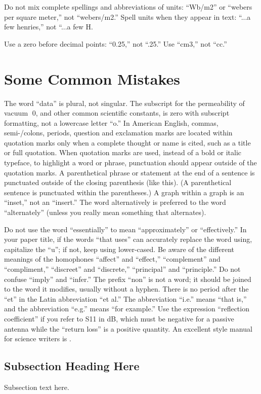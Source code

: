 \documentclass[conference,a4paper]{IEEEtran}
\begin{document}
Do not mix complete spellings and abbreviations of units: “Wb/m2” or “webers per square meter,” not “webers/m2.” Spell units when they appear in text: “...a few henries,” not “...a few H.

Use a zero before decimal points: “0.25,” not “.25.” Use “cm3,” not “cc.”


\vspace{7pt}
\section{Some Common Mistakes}
The word “data” is plural, not singular.
The subscript for the permeability of vacuum 0, and other common scientific constants, is zero with subscript formatting, not a lowercase letter “o.”
In American English, commas, semi-/colons, periods, question and exclamation marks are located within quotation marks only when a complete thought or name is cited, such as a title or full quotation. When quotation marks are used, instead of a bold or italic typeface, to highlight a word or phrase, punctuation should appear outside of the quotation marks. A parenthetical phrase or statement at the end of a sentence is punctuated outside of the closing parenthesis (like this). (A parenthetical sentence is punctuated within the parentheses.)
A graph within a graph is an “inset,” not an “insert.” The word alternatively is preferred to the word “alternately” (unless you really mean something that alternates).

Do not use the word “essentially” to mean “approximately” or “effectively.”
In your paper title, if the words “that uses” can accurately replace the word using, capitalize the “u”; if not, keep using lower-cased.
Be aware of the different meanings of the homophones “affect” and “effect,” “complement” and “compliment,” “discreet” and “discrete,” “principal” and “principle.”
Do not confuse “imply” and “infer.”
The prefix “non” is not a word; it should be joined to the word it modifies, usually without a hyphen.
There is no period after the “et” in the Latin abbreviation “et al.”
The abbreviation “i.e.” means “that is,” and the abbreviation “e.g.” means “for example.”
Use the expression “reflection coefficient” if you refer to S11 in dB, which must be negative for a passive antenna while the “return loss” is a positive quantity.
An excellent style manual for science writers is \cite{Young}.


\subsection{Subsection Heading Here}
Subsection text here.
\end{document}
